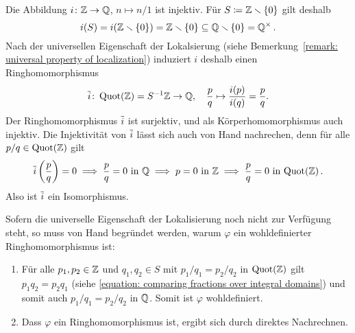 \subsection{}

Die Abbildung $i \colon \mathbb{Z} \to \mathbb{Q}$, $n \mapsto n/1$ ist injektiv.
Für $S \coloneqq \mathbb{Z} \smallsetminus \{0\}$ gilt deshalb
\[
            i(S)
  =         i(\mathbb{Z} \smallsetminus \{0\})
  =         \mathbb{Z} \smallsetminus \{0\}
  \subseteq \mathbb{Q} \smallsetminus \{0\}
  =         \mathbb{Q}^\times \,.
\]
Nach der universellen Eigenschaft der Lokalsierung (siehe Bemerkung~\ref{remark: universal property of localization}) induziert $i$ deshalb einen Ringhomomorphismus
\[
          \overline{i}
  \colon  \operatorname{Quot}(\mathbb{Z})
  =       S^{-1} \mathbb{Z}
  \to     \mathbb{Q},
  \quad   \frac{p}{q}
  \mapsto \frac{i(p)}{i(q)}
  =       \frac{p}{q}.
\]
Der Ringhomomorphismus $\overline{i}$ ist surjektiv, und als Körperhomomorphismus auch injektiv.
Die Injektivität von $\overline{i}$ lässt sich auch von Hand nachrechen, denn für alle $p/q \in \operatorname{Quot}(\mathbb{Z})$ gilt
\[
  \overline{i}\left( \frac{p}{q} \right) = 0
  \implies
  \text{$\frac{p}{q} = 0$ in $\mathbb{Q}$}
  \implies
  \text{$p = 0$ in $\mathbb{Z}$}
  \implies
  \text{$\frac{p}{q} = 0$ in $\operatorname{Quot}(\mathbb{Z})$} \,.
\]
Also ist $\overline{i}$ ein Isomorphismus.

\begin{remark}
  Sofern die universelle Eigenschaft der Lokalisierung noch nicht zur Verfügung steht, so muss von Hand begründet werden, warum $\varphi$ ein wohldefinierter Ringhomomorphismus ist:
  \begin{enumerate}
    \item
      Für alle $p_1, p_2 \in \mathbb{Z}$ und $q_1, q_2 \in S$ mit $p_1 / q_1 = p_2 / q_2$ in $\operatorname{Quot}(\mathbb{Z})$ gilt $p_1 q_2 = p_2 q_1$ (siehe \eqref{equation: comparing fractions over integral domains}) und somit auch $p_1 / q_1 = p_2 / q_2$ in $\mathbb{Q}$.
      Somit ist $\varphi$ wohldefiniert.
    \item
      Dass $\varphi$ ein Ringhomomorphismus ist, ergibt sich durch direktes Nachrechnen.
  \end{enumerate}
\end{remark}

